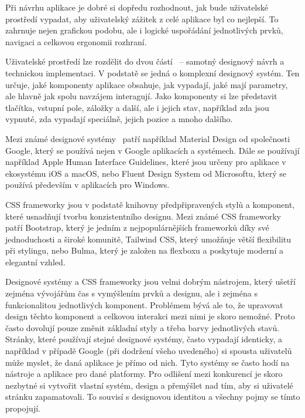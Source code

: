 Při návrhu aplikace je dobré si dopředu rozhodnout, jak bude uživatelské prostředí vypadat, aby uživatelský zážitek z celé aplikace byl co nejlepší. 
To zahrnuje nejen grafickou podobu, ale i logické uspořádání jednotlivých prvků, navigaci a celkovou ergonomii rozhraní.

Uživatelské prostředí lze rozdělit do dvou částí~\cite{kholmatova_2017} -- samotný designový návrh a technickou implementaci. 
V podstatě se jedná o komplexní designový systém. 
Ten určuje, jaké komponenty aplikace obsahuje, jak vypadají, jaké mají parametry, ale hlavně jak spolu navzájem interagují. 
Jako komponenty si lze představit tlačítka, vstupní pole, záložky a další, ale i jejich stav, například zda jsou vypnuté, zda vypadají speciálně, jejich pozice a mnoho dalšího.

Mezi známé designové systémy~\cite{tidwell_2019, kholmatova_2017, uzayr2022frontend} patří například Material Design od společnosti Google, který se používá nejen v Google aplikacích a systémech. 
Dále se používají například Apple Human Interface Guidelines, které jsou určeny pro aplikace v ekosystému iOS a macOS, nebo Fluent Design System od Microsoftu, který se používá především v aplikacích pro Windows.

CSS frameworky jsou v podstatě knihovny předpřipravených stylů a komponent, které usnadňují tvorbu konzistentního designu. 
Mezi známé CSS frameworky patří Bootstrap, který je jedním z nejpopulárnějších frameworků díky své jednoduchosti a široké komunitě, Tailwind CSS, který umožňuje větší flexibilitu při stylingu, nebo Bulma, který je založen na flexboxu a poskytuje moderní a elegantní vzhled.

Designové systémy a CSS frameworky jsou velmi dobrým nástrojem, který ušetří zejména vývojářům čas s vymýšlením prvků a designu, ale i zejména s funkcionalitou jednotlivých komponent. 
Problémem bývá ale to, že upravovat design těchto komponent a celkovou interakci mezi nimi je skoro nemožné. 
Proto často dovolují pouze změnit základní styly a třeba barvy jednotlivých stavů. 
Stránky, které používají stejné designové systémy, často vypadají identicky, a například v případě Google (při dodržení všeho uvedeného) si spousta uživatelů může myslet, že daná aplikace je přímo od nich. 
Tyto systémy se často hodí na nástroje a aplikace pro dané platformy.
Pro odlišení mezi konkurencí je skoro nezbytné si vytvořit vlastní systém, design a přemýšlet nad tím, aby si uživatelé stránku zapamatovali. 
To souvisí s designovou identitou a všechny pojmy se tímto propojují.

